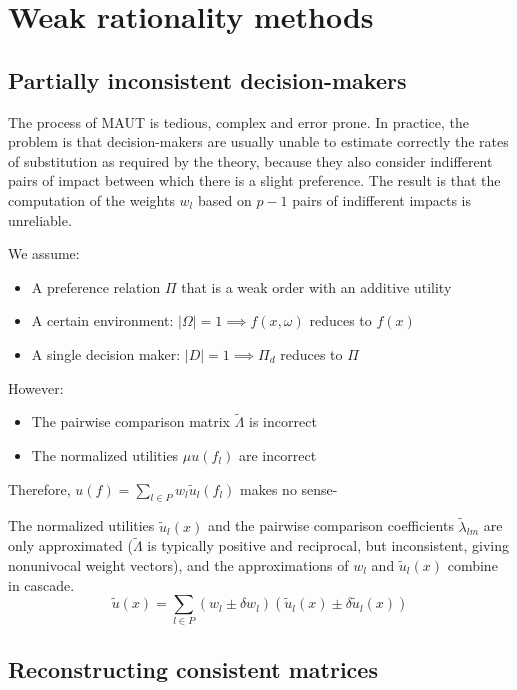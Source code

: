 \chapter{Weak rationality methods}
\label{ch:wrm}

\section{Partially inconsistent decision-makers}
\label{sec:partiallyinconsistent}

The process of MAUT is tedious, complex and error prone. In practice, the problem is that decision-makers are usually unable to estimate correctly the rates of substitution as required by the theory, because they also consider indifferent pairs of impact between which there is a slight preference. The result is that the computation of the weights $w_l$ based on $p-1$ pairs of indifferent impacts is unreliable.

We assume:
\begin{itemize}
	\item A preference relation $\Pi$ that is a weak order with an additive utility
	
	\item A certain environment: $|\Omega| = 1 \implies f(x, \omega)$ reduces to $f(x)$
	
	\item A single decision maker: $|D| = 1 \implies \Pi_d$ reduces to $\Pi$
\end{itemize}

However: 
\begin{itemize}
	\item The pairwise comparison matrix $\tilde \Lambda$ is incorrect
	
	\item The normalized utilities $\mu u(f_l)$ are incorrect
\end{itemize}
Therefore, $u(f) = \sum_{l \in P} w_l \tilde u_l (f_l)$ makes no sense-

The normalized utilities $\tilde u _l (x)$ and the pairwise comparison coefficients $\tilde \lambda_{lm}$ are only approximated ($\tilde \Lambda$ is typically positive and reciprocal, but inconsistent, giving nonunivocal weight vectors), and the approximations of $w_l$ and $\tilde u_l (x)$ combine in cascade.
$$ \tilde u(x) = \sum_{l \in P} \left(w_l \pm \delta w_l \right) \left(\tilde u_l (x) \pm \delta \tilde u_l (x)\right) $$

\section{Reconstructing consistent matrices}
\label{sec:reconstrconsistent}


